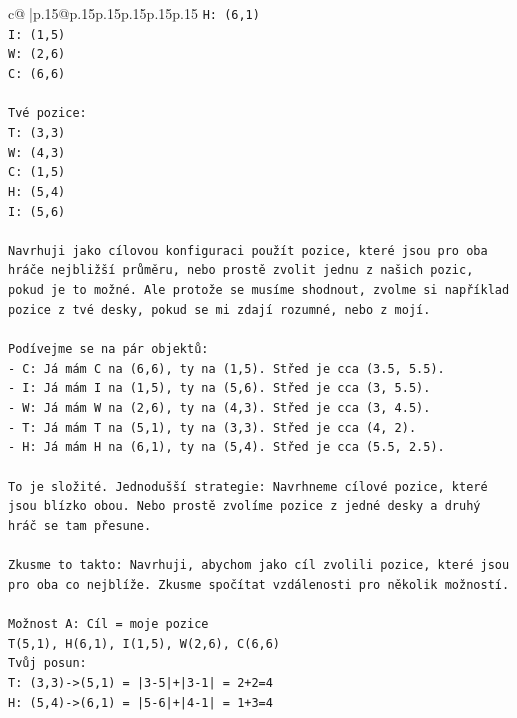 \documentclass{article}
\begin{document}
{\begin{supertabular}{c@{$\;$}|p{.15\linewidth}@{}p{.15\linewidth}p{.15\linewidth}p{.15\linewidth}p{.15\linewidth}p{.15\linewidth}}
{{{\texttt{H: (6,1)} \\
\texttt{I: (1,5)} \\
\texttt{W: (2,6)} \\
\texttt{C: (6,6)} \\
\\ 
\texttt{Tvé pozice:} \\
\texttt{T: (3,3)} \\
\texttt{W: (4,3)} \\
\texttt{C: (1,5)} \\
\texttt{H: (5,4)} \\
\texttt{I: (5,6)} \\
\\ 
\texttt{Navrhuji jako cílovou konfiguraci použít pozice, které jsou pro oba hráče nejbližší průměru, nebo prostě zvolit jednu z našich pozic, pokud je to možné. Ale protože se musíme shodnout, zvolme si například pozice z tvé desky, pokud se mi zdají rozumné, nebo z mojí.} \\
\\ 
\texttt{Podívejme se na pár objektů:} \\
\texttt{{-} C: Já mám C na (6,6), ty na (1,5). Střed je cca (3.5, 5.5).} \\
\texttt{{-} I: Já mám I na (1,5), ty na (5,6). Střed je cca (3, 5.5).} \\
\texttt{{-} W: Já mám W na (2,6), ty na (4,3). Střed je cca (3, 4.5).} \\
\texttt{{-} T: Já mám T na (5,1), ty na (3,3). Střed je cca (4, 2).} \\
\texttt{{-} H: Já mám H na (6,1), ty na (5,4). Střed je cca (5.5, 2.5).} \\
\\ 
\texttt{To je složité. Jednodušší strategie: Navrhneme cílové pozice, které jsou blízko obou. Nebo prostě zvolíme pozice z jedné desky a druhý hráč se tam přesune.} \\
\\ 
\texttt{Zkusme to takto: Navrhuji, abychom jako cíl zvolili pozice, které jsou pro oba co nejblíže. Zkusme spočítat vzdálenosti pro několik možností.} \\
\\ 
\texttt{Možnost A: Cíl = moje pozice} \\
\texttt{T(5,1), H(6,1), I(1,5), W(2,6), C(6,6)} \\
\texttt{Tvůj posun:} \\
\texttt{T: (3,3){-}>(5,1) = |3{-}5|+|3{-}1| = 2+2=4} \\
\texttt{H: (5,4){-}>(6,1) = |5{-}6|+|4{-}1| = 1+3=4} \\
}}}
\end{supertabular}}
\end{document}
